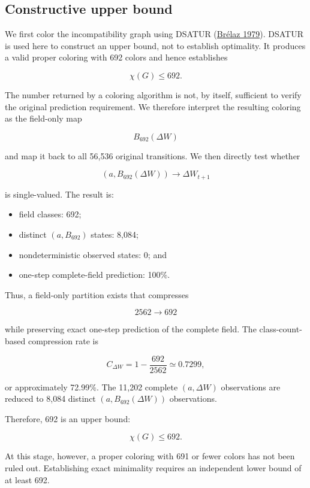 \documentclass[
  11pt,
]{article}
\providecommand{\tightlist}{%
  \setlength{\itemsep}{0pt}\setlength{\parskip}{0pt}}
\begin{document}
\subsection{Constructive upper bound}\label{constructive-upper-bound}

We first color the incompatibility graph using DSATUR
(\protect\hyperlink{ref-brelaz1979}{Brélaz 1979}). DSATUR is used here
to construct an upper bound, not to establish optimality. It produces a
valid proper coloring with 692 colors and hence establishes

\[{\chi(G)\le692.}\]

The number returned by a coloring algorithm is not, by itself,
sufficient to verify the original prediction requirement. We therefore
interpret the resulting coloring as the field-only map

\[{B_{692}(\Delta W)}\]

and map it back to all 56,536 original transitions. We then directly
test whether

\[{(a,B_{692}(\Delta W))\longrightarrow\Delta W_{t+1}}\]

is single-valued. The result is:

\begin{itemize}
\tightlist
\item
  field classes: 692;
\item
  distinct \({(a,B_{692})}\) states: 8,084;
\item
  nondeterministic observed states: 0; and
\item
  one-step complete-field prediction: 100\%.
\end{itemize}

Thus, a field-only partition exists that compresses

\[{2562\longrightarrow692}\]

while preserving exact one-step prediction of the complete field. The
class-count-based compression rate is

\[{C_{\Delta W}=1-\frac{692}{2562}\simeq0.7299,}\]

or approximately 72.99\%. The 11,202 complete \({(a,\Delta W)}\)
observations are reduced to 8,084 distinct \({(a,B_{692}(\Delta W))}\)
observations.

Therefore, 692 is an upper bound:

\[{\boxed{\chi(G)\le692}.}\]

At this stage, however, a proper coloring with 691 or fewer colors has
not been ruled out. Establishing exact minimality requires an
independent lower bound of at least 692.
\end{document}
